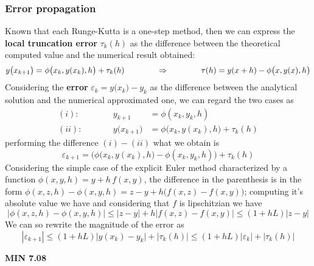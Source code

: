 		\subsubsection{Error propagation}
		Known that each Runge-Kutta is a one-step method, then we can express the \textbf{local truncation error} $\tau_k(h)$ as the difference between the theoretical computed value and the numerical result obtained:
		\[ y\big(x_{k+1}\big) = \phi\big(x_k, y(x_k),h\big) + \tau_k(h) \hspace{1.4cm} \Rightarrow \hspace{1.4cm} \tau(h) = y(x+h) -\phi\big(x,y(x),h\big) \]
		Considering the \textbf{error} $\varepsilon_k = y\big(x_k\big) - y_k$ as the difference between the analytical solution and the numerical approximated one, we can regard the two cases as
		\begin{align*}
			(i): && \qquad y_{k+1} & = \phi(x_k,y_k,h) \\ 
			(ii): && \qquad y\big(x_{k+1}\big) & = \phi\big(x_k,y(x_k),h\big) + \tau_k(h)
		\end{align*}
		performing the difference $(i)-(ii)$ what we obtain is
		\[ \varepsilon_{k+1} = \Big( \phi\big(x_k,y(x_k),h\big) - \phi(x_k,y_k,h) \Big) + \tau_k(h)\]
		Considering the simple case of the explicit Euler method characterized by a function $\phi(x,y,h) = y + h\, f(x,y)$, the difference in the parenthesis is in the form $\phi(x,z,h) - \phi(x,y,h) = z - y + h\big(f(x,z) - f(x,y)\big)$; computing it's absolute value we have and considering that $f$ is lipschitzian we have
		\[\big|\phi(x,z,h)-\phi(x,y,h) \big|  \leq |z-y| + h \big| f(x,z)- f(x,y) \big| \leq (1+hL) |z-y|\]
		We can so rewrite the magnitude of the error as
		\[ |\varepsilon_{k+1}| \leq (1+hL) \big| y(x_k) - y_k \big| + |\tau_k(h)| \leq (1+hL) |\varepsilon_k| + |\tau_k(h)| \]
	
	
		\textbf{MIN 7.08}
	
	
	
	